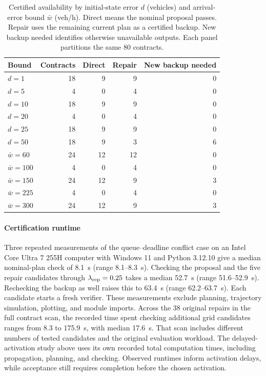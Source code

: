 \documentclass[preprint,12pt]{elsarticle}
\theoremstyle{definition}
\theoremstyle{plain}
\theoremstyle{definition}
\theoremstyle{plain}
\begin{document}
\begin{table}[!htbp]
\centering\small
\caption{Certified availability by initial-state error $d$ (vehicles) and
arrival-error bound $\bar w$ (veh/h). Direct means the nominal proposal
passes. Repair uses the remaining current plan as a certified backup.
New backup needed identifies otherwise unavailable outputs. Each panel
partitions the same 80 contracts.}
\label{tab:availability-breakdown}
\setlength{\tabcolsep}{5pt}
\begin{tabular}{@{}lrrrr@{}}
\toprule
Bound & Contracts & Direct & Repair & New backup needed\\
\midrule
$d=1$ & 18 & 9 & 9 & 0\\
$d=5$ & 4 & 0 & 4 & 0\\
$d=10$ & 18 & 9 & 9 & 0\\
$d=20$ & 4 & 0 & 4 & 0\\
$d=25$ & 18 & 9 & 9 & 0\\
$d=50$ & 18 & 9 & 3 & 6\\
\midrule
$\bar w=60$ & 24 & 12 & 12 & 0\\
$\bar w=100$ & 4 & 0 & 4 & 0\\
$\bar w=150$ & 24 & 12 & 9 & 3\\
$\bar w=225$ & 4 & 0 & 4 & 0\\
$\bar w=300$ & 24 & 12 & 9 & 3\\
\bottomrule
\end{tabular}
\end{table}

\paragraph{Certification runtime}
Three repeated measurements of the queue--deadline conflict case on an
Intel Core Ultra 7 255H computer with Windows 11 and Python 3.12.10 give
a median nominal-plan check of 8.1~s (range 8.1--8.3~s).
Checking the proposal and the five repair candidates through
$\lambda_{\rm rep}=0.25$ takes a median 52.7~s (range 51.6--52.9~s).
Rechecking the backup as well raises this to 63.4~s (range 62.2--63.7~s).
Each candidate starts a fresh verifier. These measurements exclude
planning, trajectory simulation, plotting, and module imports. Across the
38 original repairs in the full contract scan, the recorded time spent
checking additional grid candidates ranges from 8.3 to 175.9~s, with
median 17.6~s. That scan includes different numbers of tested candidates
and the original evaluation workload. The delayed-activation study above
uses its own recorded total computation times, including propagation,
planning, and checking. Observed runtimes inform activation delays,
while acceptance still requires completion before the chosen activation.
\end{document}
